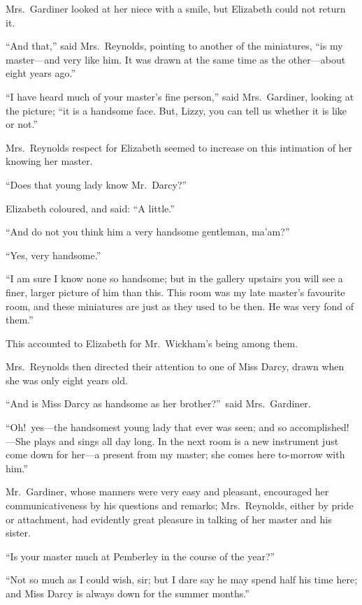 \documentclass[12pt,english]{book}
\begin{document}
Mrs.\ Gardiner looked at her niece with a smile, but Elizabeth could
not return it.

{}``And that,'' said Mrs.\ Reynolds, pointing to another of the
miniatures, {}``is my master\mbox{---}and very like him. It was
drawn at the same time as the other\mbox{---}about eight years ago.''

{}``I have heard much of your master's fine person,'' said Mrs.\
Gardiner, looking at the picture; {}``it is a handsome face. But,
Lizzy, you can tell us whether it is like or not.''

Mrs.\ Reynolds respect for Elizabeth seemed to increase on this intimation
of her knowing her master.

{}``Does that young lady know Mr.\ Darcy?''\ 

Elizabeth coloured, and said: {}``A little.''

{}``And do not you think him a very handsome gentleman, ma'am?''\ 

{}``Yes, very handsome.''

{}``I am sure I know none so handsome; but in the gallery upstairs
you will see a finer, larger picture of him than this. This room was
my late master's favourite room, and these miniatures are just as
they used to be then. He was very fond of them.''

This accounted to Elizabeth for Mr.\ Wickham's being among them.

Mrs.\ Reynolds then directed their attention to one of Miss Darcy,
drawn when she was only eight years old.

{}``And is Miss Darcy as handsome as her brother?''\ said Mrs.\ Gardiner.

{}``Oh!\ yes\mbox{---}the handsomest young lady that ever was seen;
and so accomplished!\mbox{---}She plays and sings all day long. In
the next room is a new instrument just come down for her\mbox{---}a
present from my master; she comes here to-morrow with him.''

Mr.\ Gardiner, whose manners were very easy and pleasant, encouraged
her communicativeness by his questions and remarks; Mrs.\ Reynolds,
either by pride or attachment, had evidently great pleasure in talking
of her master and his sister.

{}``Is your master much at Pemberley in the course of the year?''\ 

{}``Not so much as I could wish, sir; but I dare say he may spend
half his time here; and Miss Darcy is always down for the summer months.''
\end{document}
